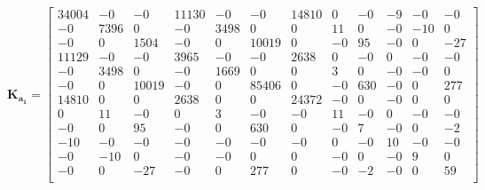 \begin{equation*}
	\boldsymbol{K_{a_1}} = 
	\begin{bmatrix}
34004 & -0 & -0 & 11130 & -0 & -0 & 14810 & 0 & -0 & -9 & -0 & -0\\ 
-0 & 7396 & 0 & -0 & 3498 & 0 & 0 & 11 & 0 & -0 & -10 & 0\\ 
-0 & 0 & 1504 & -0 & 0 & 10019 & 0 & -0 & 95 & -0 & 0 & -27\\ 
11129 & -0 & -0 & 3965 & -0 & -0 & 2638 & 0 & -0 & 0 & -0 & -0\\ 
-0 & 3498 & 0 & -0 & 1669 & 0 & 0 & 3 & 0 & -0 & -0 & 0\\ 
-0 & 0 & 10019 & -0 & 0 & 85406 & 0 & -0 & 630 & -0 & 0 & 277\\ 
14810 & 0 & 0 & 2638 & 0 & 0 & 24372 & -0 & 0 & -0 & 0 & 0\\ 
0 & 11 & -0 & 0 & 3 & -0 & -0 & 11 & -0 & 0 & -0 & -0\\ 
-0 & 0 & 95 & -0 & 0 & 630 & 0 & -0 & 7 & -0 & 0 & -2\\ 
-10 & -0 & -0 & -0 & -0 & -0 & -0 & 0 & -0 & 10 & -0 & -0\\ 
-0 & -10 & 0 & -0 & -0 & 0 & 0 & -0 & 0 & -0 & 9 & 0\\ 
-0 & 0 & -27 & -0 & 0 & 277 & 0 & -0 & -2 & -0 & 0 & 59\\ 

	\end{bmatrix}
\end{equation*}



